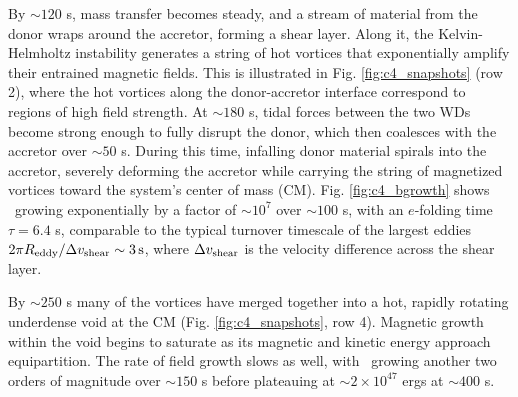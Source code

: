 By $\sim120$ s, mass transfer becomes steady, and a stream of material from the donor wraps around the accretor, forming a shear layer.  Along it, the Kelvin-Helmholtz instability generates a string of hot vortices that exponentially amplify their entrained magnetic fields.  This is illustrated in Fig. \ref{fig:c4_snapshots} (row 2), where the hot vortices along the donor-accretor interface correspond to regions of high field strength.  At $\sim180$ s, tidal forces between the two WDs become strong enough to fully disrupt the donor, which then coalesces with the accretor over $\sim50$ s.  During this time, infalling donor material spirals into the accretor, severely deforming the accretor while carrying the string of magnetized vortices toward the system's center of mass (CM).  Fig. \ref{fig:c4_bgrowth} shows \EB\ growing exponentially by a factor of $\sim10^7$ over $\sim100$ s, with an $e$-folding time $\tau = 6.4$ s, comparable to the typical turnover timescale of the largest eddies $2\pi R_\mathrm{eddy}/\Delta v_\mathrm{shear} \sim 3\,\mathrm{s}$, where $\Delta v_\mathrm{shear}$ is the velocity difference across the shear layer.


By $\sim250$ s many of the vortices have merged together into a hot, rapidly rotating underdense void at the CM (Fig. \ref{fig:c4_snapshots}, row 4).  Magnetic growth within the void begins to saturate as its magnetic and kinetic energy approach equipartition.  The rate of field growth slows as well, with \EB\ growing another two orders of magnitude over $\sim150$ s before plateauing at $\sim2\times10^{47}$ ergs at $\sim400$ s.


